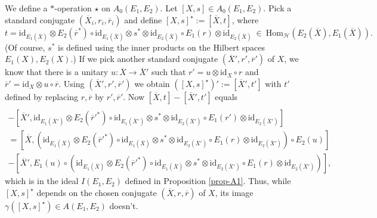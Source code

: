 \documentclass[11pt]{article}
\theoremstyle{definition}
\theoremstyle{definition}
\theoremstyle{remark}
\def\2#1{{\mathcal #1}}
\def\ol#1{{\overline #1}}
\newcommand{\Hom}{\mathrm{Hom}}
\newcommand{\mcirc}{\circ}
\newcommand{\rarr}{\rightarrow}
\def\id{\mathrm{id}}
\begin{document}
\prf We define a $*$-operation $\star$ on $A_0(E_1,E_2)$. Let $[X,s]\in A_0(E_1,E_2)$. 
Pick a standard conjugate $(\ol{X_i},r_i,\ol{r}_i)$ and define $[X,s]^\star:=[\ol{X},t]$, where 
\[ t= \id_{E_1(\ol{X})} \otimes E_2(\ol{r}^*)\mcirc \id_{E_1(\ol{X})} \otimes
    s^*\otimes\id_{E_2(\ol{X})}  \mcirc E_1(r)\otimes \id_{E_2(\ol{X})} 
   \ \in \ \Hom_\2H(E_2(\ol{X}),E_1(\ol{X})). \]
(Of course, $s^*$ is defined using the inner products on the Hilbert spaces $E_1(X),E_2(X)$.)
If we pick another standard conjugate $(\ol{X}',r',\ol{r}')$ of $X$, we know that there is a unitary
$u:\ol{X}\rarr\ol{X}'$ such that $r'=u\otimes\id_X\mcirc r$ and $\ol{r}'=\id_X\otimes u\mcirc\ol{r}$. Using
$(\ol{X}',r',\ol{r}')$ we obtain $([X,s]^\star)':=[\ol{X}',t']$ with $t'$ defined by replacing
$r,\ol{r}$ by $r',\ol{r}'$. Now $[\ol{X},t]-[\ol{X}',t']$ equals 
\begin{multline*} [\ol{X},\id_{E_1(\ol{X})} \otimes E_2(\ol{r}^*)\mcirc
    \id_{E_1(\ol{X})} \otimes  s^*\otimes\id_{E_2(\ol{X})} \mcirc E_1(r)\otimes \id_{E_2(\ol{X})}] \\
     -[\ol{X}',\id_{E_1(\ol{X}')} \otimes E_2({\ol{r}'}^*)\mcirc \id_{E_1(\ol{X}')} \otimes
    s^*\otimes\id_{E_2(\ol{X}')}  \mcirc E_1(r')\otimes \id_{E_2(\ol{X}')} ] \\ 
 = [\ol{X}, ( \id_{E_1(\ol{X})} \otimes E_2({\ol{r}'}^*)\mcirc \id_{E_1(\ol{X})} \otimes  
    s^*\otimes\id_{E_2(\ol{X}')} \mcirc E_1(r)\otimes \id_{E_2(\ol{X}')} )\mcirc E_2(u)] \\
     -[\ol{X}', E_1(u)\mcirc( \id_{E_1(\ol{X})} \otimes E_2({\ol{r}'}^*) \mcirc \id_{E_1(\ol{X})} 
   \otimes s^*\otimes\id_{E_2(\ol{X}')} \mcirc E_1(r)\otimes \id_{E_2(\ol{X}')} )], 
\end{multline*}
which is in the ideal $I(E_1,E_2)$ defined in Proposition \ref{prop-A1}. Thus, while $[X,s]^\star$
depends on the chosen conjugate $(\ol{X},r,\ol{r})$ of $X$, its image 
$\gamma([X,s]^\star)\in A(E_1,E_2)$ doesn't. 
\end{document}
